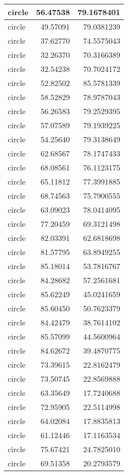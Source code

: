 \documentclass[
]{book}
\theoremstyle{definition}
\theoremstyle{definition}
\theoremstyle{definition}
\theoremstyle{definition}
\theoremstyle{remark}
\begin{document}
\begin{tabular}{l|r|r}
\hline
circle & 56.47538 & 79.1678401\\
\hline
circle & 49.57091 & 79.0381239\\
\hline
circle & 37.62770 & 74.5575043\\
\hline
circle & 32.26370 & 70.3166389\\
\hline
circle & 32.54238 & 70.7024172\\
\hline
circle & 52.82502 & 85.5781339\\
\hline
circle & 58.52829 & 78.9787043\\
\hline
circle & 56.26583 & 79.2529395\\
\hline
circle & 57.07589 & 79.1939225\\
\hline
circle & 54.25640 & 79.3138649\\
\hline
circle & 62.68567 & 78.1747433\\
\hline
circle & 68.08561 & 76.1123175\\
\hline
circle & 65.11812 & 77.3991885\\
\hline
circle & 68.74563 & 75.7900555\\
\hline
circle & 63.09023 & 78.0414095\\
\hline
circle & 77.20459 & 69.3121498\\
\hline
circle & 82.03391 & 62.6818698\\
\hline
circle & 81.57795 & 63.8949255\\
\hline
circle & 85.18014 & 53.7816767\\
\hline
circle & 84.28682 & 57.2561681\\
\hline
circle & 85.62249 & 45.0241659\\
\hline
circle & 85.60450 & 50.7623379\\
\hline
circle & 84.42479 & 38.7614102\\
\hline
circle & 85.57099 & 44.5600964\\
\hline
circle & 84.62672 & 39.4870775\\
\hline
circle & 73.39615 & 22.8162479\\
\hline
circle & 73.50745 & 22.8569888\\
\hline
circle & 63.35649 & 17.7240688\\
\hline
circle & 72.95905 & 22.5114998\\
\hline
circle & 64.02084 & 17.8835813\\
\hline
circle & 61.12446 & 17.1163534\\
\hline
circle & 75.67421 & 24.7825010\\
\hline
circle & 69.51358 & 20.2793579\\

\end{tabular}
\end{document}
